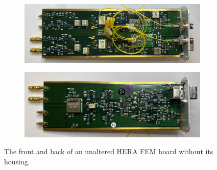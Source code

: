 \begin{figure}
    \centering
    \begin{subfigure}{\textwidth}
        \includegraphics[width=\textwidth]{fem_top.jpg}
    \end{subfigure}
    \vspace{.5cm}
    \begin{subfigure}{\textwidth}
        \includegraphics[width=\textwidth]{fem_bottom.jpg}
    \end{subfigure}
    \caption{The front and back of an unaltered HERA FEM board without its housing.}
    \label{fig:fem}
\end{figure}